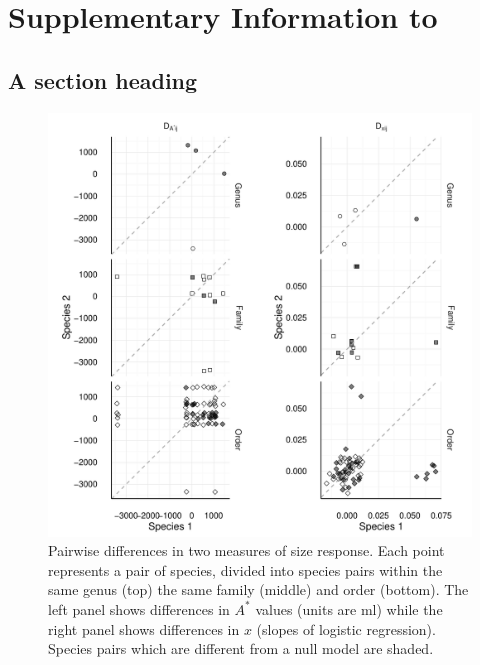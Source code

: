 \chapter{Supplementary Information to }

\section{A section heading}

\begin{figure}[htbp]
\centering
\includegraphics[width=5.5in]{figures/pairwise_astars.pdf}
\caption{Pairwise differences in two measures of size response. Each point represents a
pair of species, divided into species pairs within the same genus (top)
the same family (middle) and order (bottom). The left panel shows
differences in \(A^{*}\) values (units are ml) while the right panel
shows differences in \(x\) (slopes of logistic regression). Species
pairs which are different from a null model are shaded.}
\label{fig:pairwise}
\end{figure}

